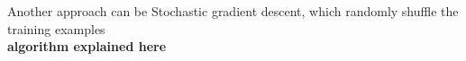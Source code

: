 Another approach can be {Stochastic gradient descent}, which randomly shuffle the training examples 
\\ \textbf{algorithm explained here}





